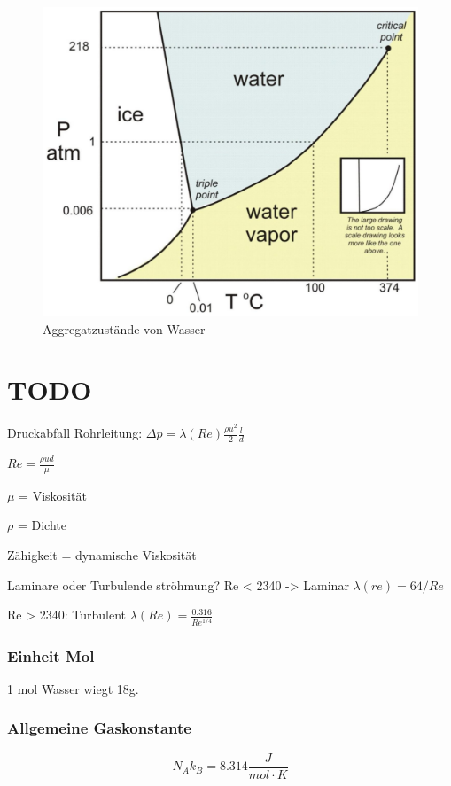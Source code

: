 \documentclass[a4paper]{scrartcl}
\begin{document}
\begin{figure}[h]
	\centering
	\includegraphics[width=0.7\linewidth]{img/wasser_aggregatszustaende}
	\caption{Aggregatzustände von Wasser}
	\label{fig:wasseraggregatszustaende}
\end{figure}


\section{TODO}


Druckabfall Rohrleitung: $\Delta p = \lambda(Re) \frac{\rho u^2}{2}\frac{l}{d}$

$Re = \frac{\rho u d}{\mu}$

$\mu$ = Viskosität

$\rho$ = Dichte

Zähigkeit = dynamische Viskosität


Laminare oder Turbulende ströhmung? 
Re < 2340 -> Laminar
	$\lambda(re) = 64/Re$
	
Re > 2340: Turbulent
	$\lambda(Re) = \frac{0.316}{Re^{1/4}}$

\subsubsection{Einheit Mol}

1 mol Wasser wiegt 18g.

\subsubsection{Allgemeine Gaskonstante}

\[
	N_A k_B = 8.314 \frac{J}{mol \cdot K}
\]
\end{document}
